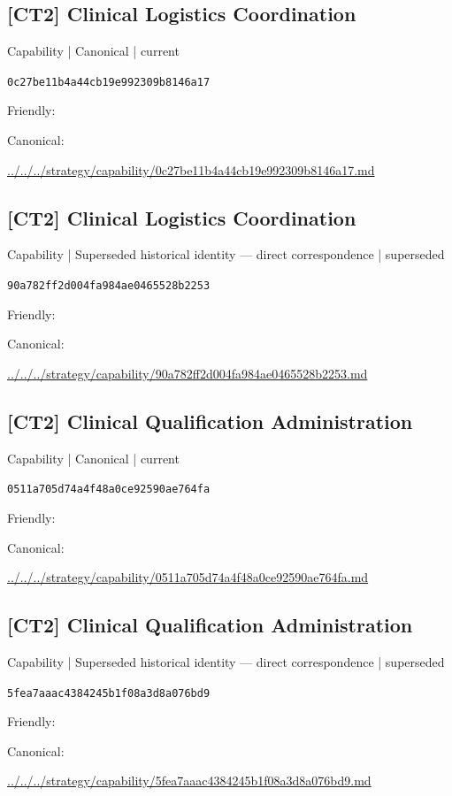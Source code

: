 \documentclass[10pt,a4paper]{article}
\begin{document}
\subsection*{[CT2] Clinical Logistics Coordination}
{\small Capability | Canonical | current}\par
\texttt{0c27be11b4a44cb19e992309b8146a17}\par
Friendly: \par
Canonical: \par
{\footnotesize\url{../../../strategy/capability/0c27be11b4a44cb19e992309b8146a17.md}}\par
\subsection*{[CT2] Clinical Logistics Coordination}
{\small Capability | Superseded historical identity — direct correspondence | superseded}\par
\texttt{90a782ff2d004fa984ae0465528b2253}\par
Friendly: \par
Canonical: \par
{\footnotesize\url{../../../strategy/capability/90a782ff2d004fa984ae0465528b2253.md}}\par
\subsection*{[CT2] Clinical Qualification Administration}
{\small Capability | Canonical | current}\par
\texttt{0511a705d74a4f48a0ce92590ae764fa}\par
Friendly: \par
Canonical: \par
{\footnotesize\url{../../../strategy/capability/0511a705d74a4f48a0ce92590ae764fa.md}}\par
\subsection*{[CT2] Clinical Qualification Administration}
{\small Capability | Superseded historical identity — direct correspondence | superseded}\par
\texttt{5fea7aaac4384245b1f08a3d8a076bd9}\par
Friendly: \par
Canonical: \par
{\footnotesize\url{../../../strategy/capability/5fea7aaac4384245b1f08a3d8a076bd9.md}}\par
\end{document}
